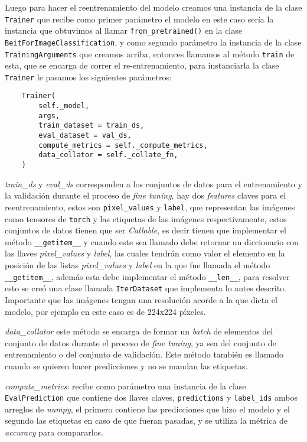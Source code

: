 Luego para hacer el reentrenamiento del modelo creamos una instancia de la clase \texttt{Trainer} que recibe como primer parámetro el modelo en este caso sería la instancia que obtuvimos al llamar \texttt{from\_pretrained()} en la clase \texttt{BeitForImageClassification}, y como segundo parámetro la instancia de la clase \texttt{TrainingArguments} que creamos arriba, entonces llamamos al método \texttt{train} de esta, que se encarga de correr el re-entrenamiento, para instanciarla la clase \texttt{Trainer} le pasamos los siguientes parámetros:

\begin{verbatim}
    Trainer(
        self._model,
        args,
        train_dataset = train_ds,
        eval_dataset = val_ds,
        compute_metrics = self._compute_metrics,
        data_collator = self._collate_fn,
    )
\end{verbatim}

\textit{train\_ds} y \textit{eval\_ds} corresponden a los conjuntos de datos para el entrenamiento y la validación durante el proceso de \textit{fine tuning}, hay dos \textit{features} claves para el reentrenamiento, estos son \texttt{pixel\_values} y \texttt{label}, que representan las imágenes como tensores de \texttt{torch} y las etiquetas de las imágenes respectivamente, estos conjuntos de datos tienen que ser \textit{Callable}, es decir tienen que implementar el método \texttt{\_\_getitem\_\_} y cuando este sea llamado debe retornar un diccionario con las llaves \textit{pixel\_values} y \textit{label}, las cuales tendrán como valor el elemento en la posición de las listas \textit{pixel\_values} y \textit{label} en la que fue llamada el método \texttt{\_\_getitem\_\_}, además esta debe implementar el método \texttt{\_\_len\_\_}, para resolver esto se creó una clase llamada \texttt{IterDataset} que implementa lo antes descrito. Importante que las imágenes tengan una resolución acorde a la que dicta el modelo, por ejemplo en este caso es de 224x224 píxeles.

\textit{data\_collator} este método se encarga de formar un \textit{batch} de elementos del conjunto de datos durante el proceso de \textit{fine tuning}, ya sea del conjunto de entrenamiento o del conjunto de validación. Este método también es llamado cuando se quieren hacer predicciones y no se mandan las etiquetas.

\textit{compute\_metrics}: recibe como parámetro una instancia de la clase \texttt{EvalPrediction} que contiene dos llaves claves, \texttt{predictions} y \texttt{label\_ids} ambos arreglos de \textit{numpy}, el primero contiene las predicciones que hizo el modelo y el segundo las etiquetas en caso de que fueran pasadas, y se utiliza la métrica de \textit{accuracy} para compararlos.


